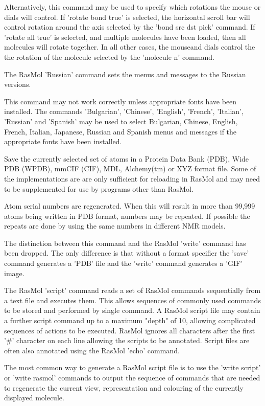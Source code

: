 Alternatively, this command may be used to specify which rotations
the mouse or dials will control.  If
'rotate bond true'
is selected, the horizontal scroll bar will control rotation around
the axis selected by the
'bond src dst pick'
command.  If
'rotate all true'
is selected, and multiple molecules have been loaded, then all molecules
will rotate together.  In all other cases, the mouseand dials control the
the rotation of the molecule selected by the
'molecule n'
command.

The RasMol
'Russian'
command sets the menus and messages to the Russian versions.

This command may not work correctly unless appropriate fonts
have been installed.  The commands
'Bulgarian',
'Chinese',
'English',
'French',
'Italian',
'Russian'
and
'Spanish'
may be used to select Bulgarian, Chinese, English, French,
Italian, Japanese, Russian and Spanish menus and messages if the
appropriate fonts have been installed.

Save the currently selected set of atoms in a Protein
Data Bank (PDB), Wide PDB (WPDB), mmCIF (CIF),
MDL, Alchemy(tm) or XYZ format file.  Some of the
implementations are are only sufficient for reloading
in RasMol and may need to be supplemented for use by
programs other than RasMol.

Atom serial numbers are regenerated.  When this will
result in more than 99,999 atoms being written in
PDB format, numbers may be repeated.  If possible
the repeats are done by using the same numbers
in different NMR models.

The distinction between this command and the RasMol
'write'
command has been dropped. The only difference is that
without a format specifier the
'save'
command generates a
'PDB'
file and the
'write'
command generates a
'GIF'
image.

The RasMol
'script'
command reads a set of RasMol commands sequentially from a
text file and executes them. This allows sequences of commonly used
commands to be stored and performed by single command. A RasMol script
file may contain a further script command up to a maximum "depth" of 10,
allowing complicated sequences of actions to be executed. RasMol
ignores all characters after the first '#' character on each line
allowing the scripts to be annotated. Script files are often also
annotated using the RasMol
'echo'
command.

The most common way to generate a RasMol script file is to use the
'write script'
or
'write rasmol'
commands to output the sequence of commands that are needed to
regenerate the current view, representation and colouring of the
currently displayed molecule.

